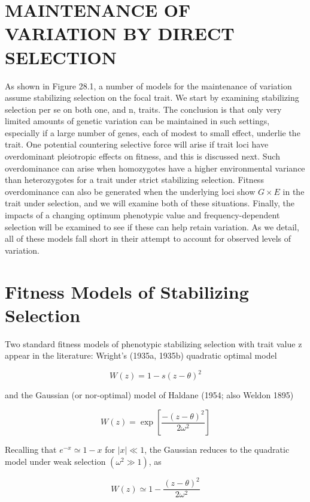 \documentclass{article}
\begin{document}
\section{MAINTENANCE OF VARIATION BY DIRECT SELECTION}
As shown in Figure 28.1, a number of models for the maintenance of variation assume stabilizing selection on the focal trait. We start by examining stabilizing selection per se on both one, and n, traits. The conclusion is that only very limited amounts of genetic variation can be maintained in such settings, especially if a large number of genes, each of modest to small effect, underlie the trait. One potential countering selective force will arise if trait loci have overdominant pleiotropic effects on fitness, and this is discussed next. Such overdominance can arise when homozygotes have a higher environmental variance than heterozygotes for a trait under strict stabilizing selection. Fitness overdominance can also be generated when the underlying loci show  $ G \times E $ in the trait under selection, and we will examine both of these situations. Finally, the impacts of a changing optimum phenotypic value and frequency-dependent selection will be examined to see if these can help retain variation. As we detail, all of these models fall short in their attempt to account for observed levels of variation.

\section{Fitness Models of Stabilizing Selection}
Two standard fitness models of phenotypic stabilizing selection with trait value z appear in the literature: Wright's (1935a, 1935b) quadratic optimal model

\begin{equation}
W(z)=1-s(z-\theta)^{2}
\tag{28.3a}
\label{eq:28_3a}
\end{equation}

and the Gaussian (or nor-optimal) model of Haldane (1954; also Weldon 1895)

\begin{equation}
W(z)=\exp\left[\frac{-(z-\theta)^{2}}{2\omega^{2}}\right]
\tag{28.3b}
\label{eq:28_3b}
\end{equation}

Recalling that  $ e^{-x} \simeq 1 - x $ for  $ |x| \ll 1 $, the Gaussian reduces to the quadratic model under weak selection  $ (\omega^2 \gg 1) $, as

\begin{equation}
W(z)\simeq1-\frac{(z-\theta)^{2}}{2\omega^{2}}
\tag{28.3c}
\label{eq:28_3c}
\end{equation}
\end{document}
